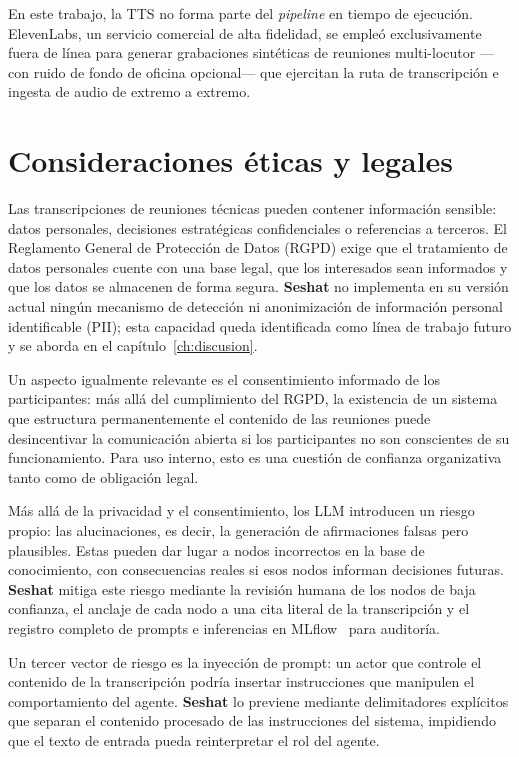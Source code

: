 En este trabajo, la TTS no forma parte del \textit{pipeline} en tiempo de ejecución. ElevenLabs,
un servicio comercial de alta fidelidad, se empleó exclusivamente fuera de línea para generar
grabaciones sintéticas de reuniones multi-locutor —con ruido de fondo de oficina opcional— que
ejercitan la ruta de transcripción e ingesta de audio de extremo a extremo.

\section{Consideraciones éticas y legales}

Las transcripciones de reuniones técnicas pueden contener información sensible: datos personales,
decisiones estratégicas confidenciales o referencias a terceros. El Reglamento General de
Protección de Datos (RGPD) exige que el tratamiento de datos personales cuente con una base
legal, que los interesados sean informados y que los datos se almacenen de forma segura.
\textbf{Seshat} no implementa en su versión actual ningún mecanismo de detección ni anonimización
de información personal identificable (PII); esta capacidad queda identificada como línea de
trabajo futuro y se aborda en el capítulo~\ref{ch:discusion}.

Un aspecto igualmente relevante es el consentimiento informado de los participantes: más allá del
cumplimiento del RGPD, la existencia de un sistema que estructura permanentemente el contenido de
las reuniones puede desincentivar la comunicación abierta si los participantes no son conscientes
de su funcionamiento. Para uso interno, esto es una cuestión de confianza organizativa tanto como
de obligación legal.

Más allá de la privacidad y el consentimiento, los \ac{LLM} introducen un riesgo propio: las
alucinaciones, es decir, la generación de afirmaciones falsas pero plausibles. Estas pueden dar
lugar a nodos incorrectos en la base de conocimiento, con consecuencias reales si esos nodos
informan decisiones futuras. \textbf{Seshat} mitiga este riesgo mediante la revisión humana de
los nodos de baja confianza, el anclaje de cada nodo a una cita literal de la transcripción y el
registro completo de prompts e inferencias en MLflow~\cite{zaharia2018mlflow} para auditoría.

Un tercer vector de riesgo es la inyección de prompt: un actor que controle el contenido de la
transcripción podría insertar instrucciones que manipulen el comportamiento del agente.
\textbf{Seshat} lo previene mediante delimitadores explícitos que separan el contenido procesado
de las instrucciones del sistema, impidiendo que el texto de entrada pueda reinterpretar el rol
del agente.

